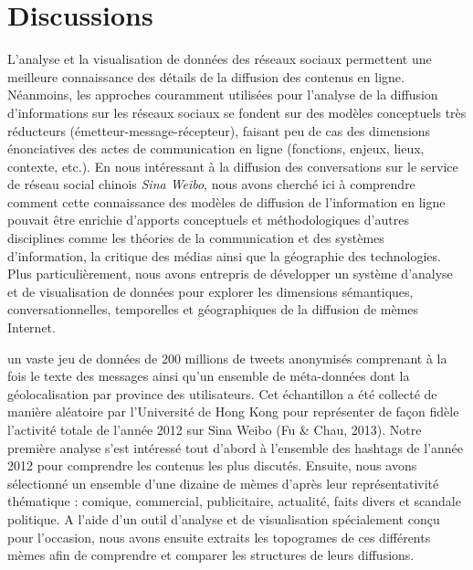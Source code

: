 \section[Discussions]{Discussions}

L{\textquoteright}analyse et la visualisation de donn\'ees des r\'eseaux  sociaux permettent une meilleure connaissance des d\'etails de la  diffusion des contenus en ligne. N\'eanmoins, les approches couramment  utilis\'ees pour l{\textquoteright}analyse de la diffusion  d{\textquoteright}informations sur les r\'eseaux sociaux se fondent sur  des mod\`eles conceptuels tr\`es r\'educteurs  (\'emetteur-message-r\'ecepteur), faisant peu de cas des dimensions  \'enonciatives des actes de communication en ligne (fonctions, enjeux,  lieux, contexte, etc.). En nous int\'eressant \`a la diffusion des  conversations sur le service de r\'eseau social chinois \textit{Sina  Weibo}, nous avons cherch\'e ici \`a comprendre comment cette  connaissance des mod\`eles de diffusion de  l{\textquoteright}information en ligne pouvait \^etre enrichie  d{\textquoteright}apports conceptuels et m\'ethodologiques  d{\textquoteright}autres disciplines comme les th\'eories de la  communication et des syst\`emes d{\textquoteright}information, la  critique des m\'edias ainsi que la g\'eographie des technologies. Plus  particuli\`erement, nous avons entrepris de d\'evelopper un syst\`eme  d{\textquoteright}analyse et de visualisation de donn\'ees pour  explorer les dimensions s\'emantiques, conversationnelles, temporelles  et g\'eographiques de la diffusion de m\`emes Internet.   
 
un vaste jeu de données de 200 millions de tweets anonymisés comprenant à la fois le texte des messages ainsi qu{\textquoteright}un ensemble de méta-données dont la géolocalisation par province des utilisateurs. Cet échantillon a été collecté de manière aléatoire par l{\textquoteright}Université de Hong Kong pour représenter de fa\c{c}on fidèle l{\textquoteright}activité totale de l{\textquoteright}année 2012 sur Sina Weibo (Fu \& Chau, 2013). Notre première analyse s{\textquoteright}est intéressé tout d{\textquoteright}abord à l{\textquoteright}ensemble des hashtags de l{\textquoteright}année 2012 pour comprendre les contenus les plus discutés. Ensuite, nous avons sélectionné un ensemble d{\textquoteright}une dizaine de mèmes d{\textquoteright}après leur représentativité thématique : comique, commercial, publicitaire, actualité, faits divers et scandale politique. A l{\textquoteright}aide d{\textquoteright}un outil d{\textquoteright}analyse et de visualisation spécialement con\c{c}u pour l{\textquoteright}occasion, nous avons ensuite extraits les topogrames de ces différents mèmes afin de comprendre et comparer les structures de leurs diffusions.


